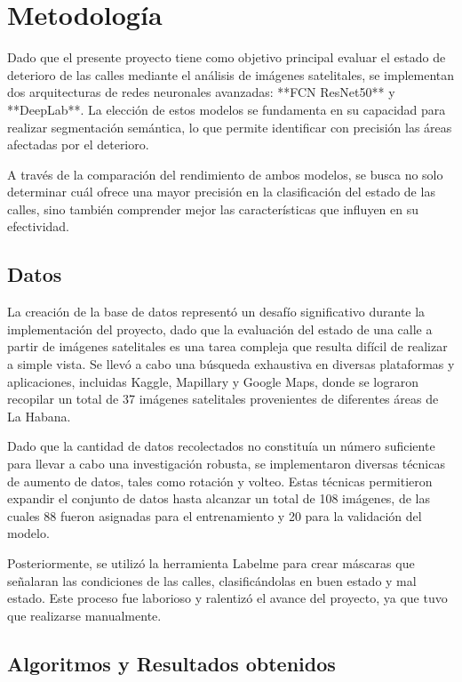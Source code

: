 \documentclass{article}
\begin{document}
\section{Metodología}
Dado que el presente proyecto tiene como objetivo principal evaluar el estado de deterioro de las calles mediante el análisis de imágenes satelitales, se implementan dos arquitecturas de redes neuronales avanzadas: **FCN ResNet50** y **DeepLab**. La elección de estos modelos se fundamenta en su capacidad para realizar segmentación semántica, lo que permite identificar con precisión las áreas afectadas por el deterioro.

A través de la comparación del rendimiento de ambos modelos, se busca no solo determinar cuál ofrece una mayor precisión en la clasificación del estado de las calles, sino también comprender mejor las características que influyen en su efectividad.

\subsection{Datos}
La creación de la base de datos representó un desafío significativo durante la implementación del proyecto, dado que la evaluación del estado de una calle a partir de imágenes satelitales es una tarea compleja que resulta difícil de realizar a simple vista. Se llevó a cabo una búsqueda exhaustiva en diversas plataformas y aplicaciones, incluidas Kaggle, Mapillary y Google Maps, donde se lograron recopilar un total de 37 imágenes satelitales provenientes de diferentes áreas de La Habana.

Dado que la cantidad de datos recolectados no constituía un número suficiente para llevar a cabo una investigación robusta, se implementaron diversas técnicas de aumento de datos, tales como rotación y volteo. Estas técnicas permitieron expandir el conjunto de datos hasta alcanzar un total de 108 imágenes, de las cuales 88 fueron asignadas para el entrenamiento y 20 para la validación del modelo.

Posteriormente, se utilizó la herramienta Labelme para crear máscaras que señalaran las condiciones de las calles, clasificándolas en buen estado y mal estado. Este proceso fue laborioso y ralentizó el avance del proyecto, ya que tuvo que realizarse manualmente.

\subsection{Algoritmos y Resultados obtenidos}
\end{document}
